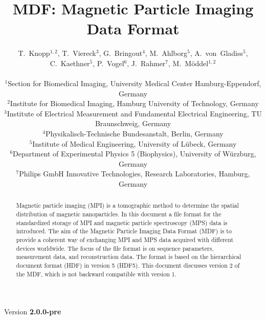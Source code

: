 \documentclass[landscape,a4paper]{article} %
\begin{document}
\title{MDF: Magnetic Particle Imaging Data Format}
\newcommand{\version}{2.0.0-pre}

\author{
T.~Knopp$^{1,2}$, T.~Viereck$^3$, G.~Bringout$^4$, M.~Ahlborg$^5$, A.~von~Gladiss$^5$, C.~Kaethner$^5$, P.~Vogel$^6$, J.~Rahmer$^7$, M.~M\"oddel$^{1,2}$ \\ \\
$^1$Section for Biomedical Imaging, University Medical Center Hamburg-Eppendorf, Germany\\
$^2$Institute for Biomedical Imaging, Hamburg University of Technology, Germany\\
$^3$Institute of Electrical Measurement and Fundamental Electrical Engineering, TU Braunschweig, Germany\\
$^4$Physikalisch-Technische Bundesanstalt, Berlin, Germany\\
$^5$Institute of Medical Engineering, University of  Lübeck, Germany\\
$^6$Department of Experimental Physics 5 (Biophysics), University of Würzburg, Germany\\
$^7$Philips GmbH Innovative Technologies, Research Laboratories, Hamburg, Germany
}

\maketitle
\begin{center}
Version \textbf{\version}
\end{center}

\begin{abstract}
Magnetic particle imaging (MPI) is a tomographic method to determine the spatial distribution of magnetic nanoparticles. In this document a file format for the standardized storage of MPI and magnetic particle spectroscopy (MPS) data is introduced. The aim of the Magnetic Particle Imaging Data Format (MDF) is to provide a coherent way of exchanging MPI and MPS data acquired with different devices worldwide. The focus of the file format is on sequence parameters, measurement data, and reconstruction data. The format is based on the hierarchical document format (HDF) in version 5 (HDF5). This document discusses version 2 of the MDF, which is not backward compatible with version 1.
\end{abstract}
\end{document}
